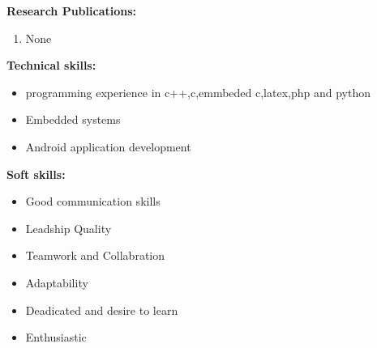 \documentclass[10pt,a4paper]{article}
\begin{document}
\begin{flushleft}
	\textbf{Research Publications:}
	\begin{enumerate}
		\item None\\ \medskip
	\end{enumerate} 
	\textbf{Technical skills:}\\
	\begin{itemize}
		\item programming experience in c++,c,emmbeded c,latex,php and python\\
		\item  Embedded systems\\
		\item  Android application development\\
	\end{itemize}
	\textbf{Soft skills:}\\
	\begin{itemize}
		\item Good communication skills\\
		\item Leadship Quality\\
		\item Teamwork and Collabration\\
		\item Adaptability\\
		\item Deadicated and desire to learn\\
		\item Enthusiastic\\
		
	\end{itemize}
	
\end{flushleft}

 
\end{document}
